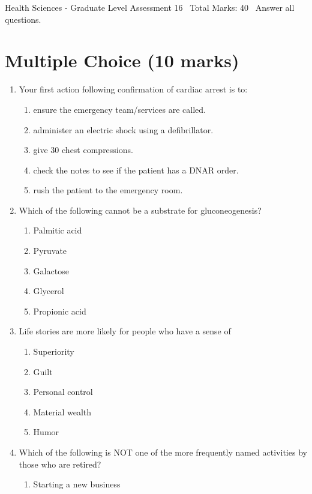 \documentclass[12pt]{article}
\begin{document}
\begin{center}
Health Sciences - Graduate Level Assessment 16 \
Total Marks: 40 \
Answer all questions.
\end{center}

\section*{Multiple Choice (10 marks)}
\begin{enumerate}[label=\arabic*.]
\item Your first action following confirmation of cardiac arrest is to:
\begin{enumerate}[label=(\alph*)]
    \item ensure the emergency team/services are called.
    \item administer an electric shock using a defibrillator.
    \item give 30 chest compressions.
    \item check the notes to see if the patient has a DNAR order.
    \item rush the patient to the emergency room.
\end{enumerate}
\item Which of the following cannot be a substrate for gluconeogenesis?
\begin{enumerate}[label=(\alph*)]
    \item Palmitic acid
    \item Pyruvate
    \item Galactose
    \item Glycerol
    \item Propionic acid
\end{enumerate}
\item Life stories are more likely for people who have a sense of
\begin{enumerate}[label=(\alph*)]
    \item Superiority
    \item Guilt
    \item Personal control
    \item Material wealth
    \item Humor
\end{enumerate}
\item Which of the following is NOT one of the more frequently named activities by those who are retired?
\begin{enumerate}[label=(\alph*)]
    \item Starting a new business

\end{enumerate}
\end{enumerate}
\end{document}

